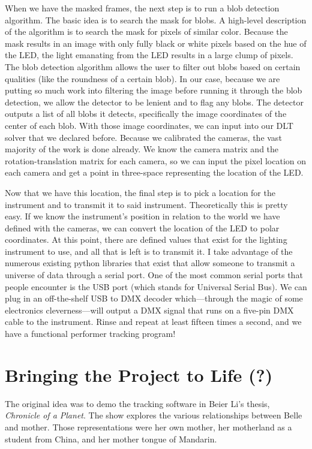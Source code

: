 \documentclass[
    12pt,
    twoside,
    bibstyle=chicago,
    headerstyle=uppercase,
	bibfile=biblatex_updating.bib
]{reedthesis}
\begin{document}
When we have the masked frames, the next step is to run a blob detection algorithm. The basic idea is to search the mask for blobs. A high-level description of the algorithm is to search the mask for pixels of similar color. Because the mask results in an image with only fully black or white pixels based on the hue of the LED, the light emanating from the LED results in a large clump of pixels. The blob detection algorithm allows the user to filter out blobs based on certain qualities (like the roundness of a certain blob). In our case, because we are putting so much work into filtering the image before running it through the blob detection, we allow the detector to be lenient and to flag any blobs. The detector outputs a list of all blobs it detects, specifically the image coordinates of the center of each blob. With those image coordinates, we can input into our DLT solver that we declared before. Because we calibrated the cameras, the vast majority of the work is done already. We know the camera matrix and the rotation-translation matrix for each camera, so we can input the pixel location on each camera and get a point in three-space representing the location of the LED.
	
Now that we have this location, the final step is to pick a location for the instrument and to transmit it to said instrument. Theoretically this is pretty easy. If we know the instrument's position in relation to the world we have defined with the cameras, we can convert the location of the LED to polar coordinates. At this point, there are defined values that exist for the lighting instrument to use, and all that is left is to transmit it. I take advantage of the numerous existing python libraries that exist that allow someone to transmit a universe of data through a serial port. One of the most common serial ports that people encounter is the USB port (which stands for Universal Serial Bus). We can plug in an off-the-shelf USB to DMX decoder which---through the magic of some electronics cleverness---will output a DMX signal that runs on a five-pin DMX cable to the instrument. Rinse and repeat at least fifteen times a second, and we have a functional performer tracking program!

\chapter{Bringing the Project to Life (?)}
The original idea was to demo the tracking software in Beier Li's thesis, \textit{Chronicle of a Planet}. The show explores the various relationships between Belle and mother. Those representations were her own mother, her motherland as a student from China, and her mother tongue of Mandarin.
\end{document}
